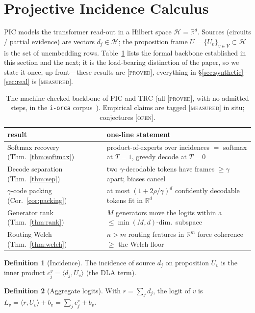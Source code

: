 \documentclass[sigconf,nonacm]{acmart}
\theoremstyle{definition}
\newtheorem{definition}{Definition}
\newcommand{\R}{\mathbb{R}}
\renewcommand{\H}{\mathcal{H}}
\newcommand{\inner}[2]{\langle #1, #2\rangle}
\newcommand{\Uv}{U_v}
\renewcommand{\dj}{d_j}  %
\newcommand{\proved}{\textsc{[proved]}}
\newcommand{\measured}{\textsc{[measured]}}
\newcommand{\open}{\textsc{[open]}}
\begin{document}
\section{Projective Incidence Calculus}
\label{sec:pic}

PIC models the transformer read-out in a Hilbert space $\H=\R^d$. Sources (circuits
/ partial evidence) are vectors $\dj\in\H$; the proposition frame
$U=\{\Uv\}_{v\in V}\subset\H$ is the set of unembedding rows.
Table~\ref{tab:proved} lists the formal backbone established in this section and the
next; it is the load-bearing distinction of the paper, so we state it once, up
front---these results are \proved, everything in
\S\ref{sec:synthetic}--\ref{sec:real} is \measured.

\begin{table}[t]
\caption{The machine-checked backbone of PIC and TRC (all \proved, with no admitted
steps, in the \texttt{i-orca} corpus~\cite{iorca}). Empirical claims are tagged
\measured{} in situ; conjectures \open.}
\label{tab:proved}
\small
\begin{tabular}{@{}lp{}@{}}
\toprule
result & one-line statement \\
\midrule
Softmax recovery (Thm.~\ref{thm:softmax}) & product-of-experts over incidences $=$ softmax at $T{=}1$, greedy decode at $T{=}0$ \\
Decode separation (Thm.~\ref{thm:sep}) & two $\gamma$-decodable tokens have frames $\ge\gamma$ apart; biases cancel \\
$\gamma$-code packing (Cor.~\ref{cor:packing}) & at most $(1+2\rho/\gamma)^d$ confidently decodable tokens fit in $\R^d$ \\
Generator rank (Thm.~\ref{thm:rank}) & $M$ generators move the logits within a $\le\min(M,d)$-dim.\ subspace \\
Routing Welch (Thm.~\ref{thm:welch}) & $n>m$ routing features in $\R^m$ force coherence $\ge$ the Welch floor \\
\bottomrule
\end{tabular}
\end{table}

\begin{definition}[Incidence]
The incidence of source $\dj$ on proposition $\Uv$ is the inner product
$c_j^v=\inner{\dj}{\Uv}$ (the DLA term).
\end{definition}

\begin{definition}[Aggregate logits]
With $r=\sum_j \dj$, the logit of $v$ is
$L_v=\inner{r}{\Uv}+b_v=\sum_j c_j^v+b_v.$
\end{definition}
\end{document}
